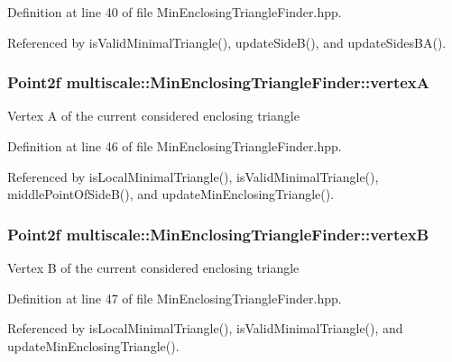 Definition at line 40 of file Min\-Enclosing\-Triangle\-Finder.\-hpp.



Referenced by is\-Valid\-Minimal\-Triangle(), update\-Side\-B(), and update\-Sides\-B\-A().

\hypertarget{classmultiscale_1_1MinEnclosingTriangleFinder_adb758ed8b7e8758436d9f1bb381e017e}{
\subsubsection[{vertex\-A}]{\setlength{\rightskip}{0pt plus 5cm}Point2f multiscale\-::\-Min\-Enclosing\-Triangle\-Finder\-::vertex\-A\hspace{0.3cm}{\ttfamily [private]}}}\label{classmultiscale_1_1MinEnclosingTriangleFinder_adb758ed8b7e8758436d9f1bb381e017e}
Vertex A of the current considered enclosing triangle 

Definition at line 46 of file Min\-Enclosing\-Triangle\-Finder.\-hpp.



Referenced by is\-Local\-Minimal\-Triangle(), is\-Valid\-Minimal\-Triangle(), middle\-Point\-Of\-Side\-B(), and update\-Min\-Enclosing\-Triangle().

\hypertarget{classmultiscale_1_1MinEnclosingTriangleFinder_a18e5ea5e0b341b3d02c4a75887f44c9c}{
\subsubsection[{vertex\-B}]{\setlength{\rightskip}{0pt plus 5cm}Point2f multiscale\-::\-Min\-Enclosing\-Triangle\-Finder\-::vertex\-B\hspace{0.3cm}{\ttfamily [private]}}}\label{classmultiscale_1_1MinEnclosingTriangleFinder_a18e5ea5e0b341b3d02c4a75887f44c9c}
Vertex B of the current considered enclosing triangle 

Definition at line 47 of file Min\-Enclosing\-Triangle\-Finder.\-hpp.



Referenced by is\-Local\-Minimal\-Triangle(), is\-Valid\-Minimal\-Triangle(), and update\-Min\-Enclosing\-Triangle().

